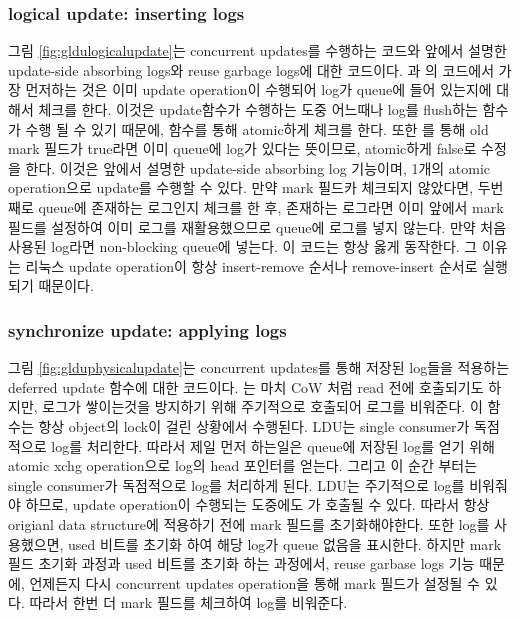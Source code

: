 \subsubsection{logical update: inserting logs}
\ifkor
그림 \ref{fig:gldulogicalupdate}는 concurrent updates를 수행하는 코드와 앞에서 설명한 update-side
absorbing logs와 reuse garbage logs에 대한 코드이다. 
과 의 코드에서 가장 먼저하는 것은 이미 update
operation이 수행되어 log가 queue에 들어 있는지에 대해서 체크를 한다. 
이것은 update함수가 수행하는 도중 어느때나 log를 flush하는  함수가 수행 될 수 있기 때문에,
 함수를 통해 atomic하게 체크를 한다. 
또한 를 통해 old mark 필드가 true라면 이미 queue에 log가 있다는 뜻이므로, atomic하게 false로
수정을 한다.
이것은 앞에서 설명한 update-side absorbing log 기능이며, 1개의 atomic operation으로 update를 수행할 수
있다.
만약 mark 필드카 체크되지 않았다면, 두번째로 queue에 존재하는 로그인지 체크를 한 후, 존재하는 로그라면
이미 앞에서 mark필드를 설정하여 이미 로그를 재활용했으므로 queue에 로그를 넣지 않는다.
만약 처음 사용된 log라면 non-blocking queue에 넣는다.
이 코드는 항상 옳게 동작한다.  
그 이유는 리눅스 update operation이 항상 insert-remove 순서나 remove-insert 순서로 실행되기 때문이다.
\else


\fi


\subsubsection{synchronize update: applying logs}



\ifkor
그림 \ref{fig:glduphysicalupdate}는 concurrent updates를 통해 저장된 log들을 적용하는 deferred
update 함수에 대한 코드이다.
는 마치 CoW 처럼 read 전에 호출되기도 하지만, 로그가 쌓이는것을 방지하기 위해 주기적으로
호출되어 로그를 비워준다.
이 함수는 항상 object의 lock이 걸린 상황에서 수행된다. 
LDU는 single consumer가 독점적으로 log를 처리한다.
따라서 제일 먼저 하는일은 queue에 저장된 log를 얻기 위해 atomic xchg operation으로 log의 head 포인터를
얻는다.
그리고 이 순간 부터는 single consumer가 독점적으로 log를 처리하게 된다.
LDU는 주기적으로 log를 비워줘야 하므로, update operation이 수행되는 도중에도 가
호출될 수 있다.
따라서 항상 origianl data structure에 적용하기 전에 mark 필드를 초기화해야한다.
또한 log를 사용했으면, used 비트를 초기화 하여 해당 log가 queue 없음을 표시한다.
하지만 mark 필드 초기화 과정과 used 비트를 초기화 하는 과정에서, reuse garbase logs 기능 때문에,
언제든지 다시 concurrent updates operation을 통해 mark 필드가 설정될 수 있다.
따라서 한번 더 mark 필드를 체크하여 log를 비워준다.
\else

